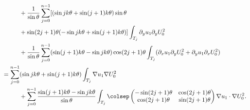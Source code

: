 \begin{align*}
&\hspace*{1cm}+ \frac{1}{\sin \theta}\sum_{j=0}^{n-1}[ (\sin jk\theta + \sin(j+1)k\theta)\sin \theta\\
&\hspace*{1cm}+ \sin (2j+1)\theta (-\sin jk\theta +\sin(j+1)k\theta) ]\int_{T_j} \partial_y u_1 \partial_y U_0^2\\
&\hspace*{1cm}+\frac{1}{\sin \theta}\sum_{j=0}^{n-1} (\sin(j+1)k\theta-\sin jk\theta)\cos(2j+1)\theta
\int_{T_j} (\partial_x u_1 \partial_y U_0^2 + \partial_y u_1 \partial_x U_0^2)\\
&= \sum_{j=0}^{n-1}(\sin jk\theta + \sin(j+1)k\theta) \int_{T_j} \nabla u_1 \nabla U_0^2\\
&\hspace*{1cm}+ \sum_{j=0}^{n-1}\dfrac{\sin(j+1)k\theta-\sin jk\theta}{\sin \theta} \int _{T_j}\colsep \begin{pmatrix}
-\sin (2j+1)\theta & \cos (2j+1) \theta \\
\cos (2j+1)\theta & \sin (2j+1)\theta
\end{pmatrix}\nabla u_1 \cdot \nabla U_0^2.
\end{align*}
\egroup\newpage

